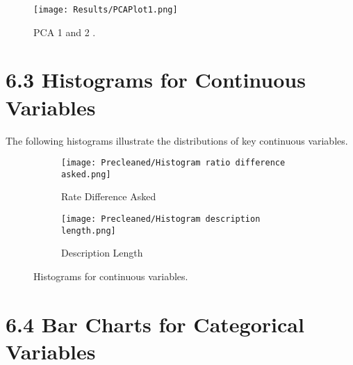 \documentclass{article}
\begin{document}
\begin{figure}[H]
    \centering
    \texttt{[image: Results/PCAPlot1.png]} %
    \caption{PCA 1 and 2 .}
    \label{fig:table_description}
\end{figure}



\section*{6.3 Histograms for Continuous Variables}
The following histograms illustrate the distributions of key continuous variables.

\begin{figure}[H]
    \centering
    \begin{subfigure}[b]{0.45\textwidth}
        \texttt{[image: Precleaned/Histogram ratio difference asked.png]} %
        \caption{Rate Difference Asked}
        \label{fig:rate_difference}
    \end{subfigure}
    \hfill
    \begin{subfigure}[b]{0.45\textwidth}
        \texttt{[image: Precleaned/Histogram description length.png]} %
        \caption{Description Length}
        \label{fig:description_length}
    \end{subfigure}
    \caption{Histograms for continuous variables.}
    \label{fig:histograms_continuous}
\end{figure}

\section*{6.4 Bar Charts for Categorical Variables}
\end{document}
